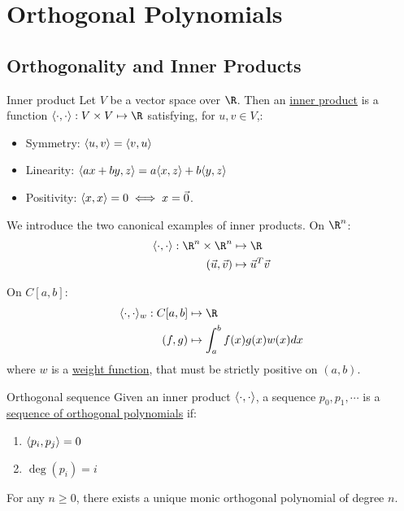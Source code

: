 \documentclass[../Main.tex]{subfiles}
\begin{document}
\section{Orthogonal Polynomials}
\subsection{Orthogonality and Inner Products}
\begin{definition}{Inner product}
    Let $V$ be a vector space over $\R$. Then an \underline{inner product} is a function $\inn{\cdot}{\cdot} : V \times V \mapsto \R$ satisfying, for $u, v \in V$,:
    \begin{itemize}
        \item Symmetry: $\langle u,v\rangle = \langle v,u\rangle$
        \item Linearity: $\langle ax + by,z\rangle = a\langle x,z\rangle + b\langle y,z\rangle$
        \item Positivity: $\langle x,x\rangle = 0 \iff x = \vec{0}$.
    \end{itemize}
\end{definition}
\begin{example}
    We introduce the two canonical examples of inner products.
    On $\R^n$:
    \begin{align*}
        \inn{\cdot}{\cdot} : \R^n \times \R^n &\mapsto \R\\
        (\vec{u}, \vec{v}) &\mapsto \vec{u}^T \vec{v}
    \end{align*}

    On $C[a,b]$:
    \begin{align*}
        \inn{\cdot}{\cdot}_w : C[a, b] &\mapsto \R\\
        (f, g) &\mapsto \int_{a}^{b} f(x)g(x) w(x) dx 
    \end{align*}
    where $w$ is a \underline{weight function}, that must be strictly positive on $(a, b)$.
\end{example}
\begin{definition}{Orthogonal sequence}
    Given an inner product $\langle\cdot,\cdot\rangle$, a sequence $p_0, p_1, \cdots$ is a  \underline{sequence of orthogonal polynomials} if:
    \begin{enumerate}
        \item $\langle p_i,p_j\rangle = 0$
        \item $\deg(p_i) = i$
    \end{enumerate}
\end{definition}
\begin{theorem}
    For any $n \geq 0$, there exists a unique monic orthogonal polynomial of degree $n$.
    \label{thmUniqueOrthoSequence}
\end{theorem}
\end{document}
